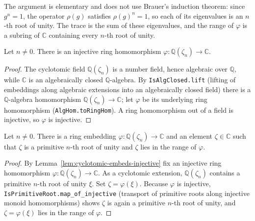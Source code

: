 The argument is elementary and does not use Brauer's induction theorem: since $g^n
= 1$, the operator $\rho(g)$ satisfies $\rho(g)^n = 1$, so each of its eigenvalues
is an $n$-th root of unity. The trace is the sum of these eigenvalues, and the
range of $\varphi$ is a subring of $\mathbb{C}$ containing every $n$-th root of
unity.

\begin{lemma}
    \label{lem:cyclotomic-embeds-injective}
    \leanok
    Let $n \neq 0$. There is an injective ring homomorphism
    $\varphi : \mathbb{Q}(\zeta_n) \to \mathbb{C}$.
\end{lemma}
\begin{proof}
    The cyclotomic field $\mathbb{Q}(\zeta_n)$ is a number field, hence algebraic
    over $\mathbb{Q}$, while $\mathbb{C}$ is an algebraically closed
    $\mathbb{Q}$-algebra. By \texttt{IsAlgClosed.lift} (lifting of embeddings
    along algebraic extensions into an algebraically closed field) there is a
    $\mathbb{Q}$-algebra homomorphism $\mathbb{Q}(\zeta_n) \to \mathbb{C}$; let
    $\varphi$ be its underlying ring homomorphism (\texttt{AlgHom.toRingHom}). A
    ring homomorphism out of a field is injective, so $\varphi$ is injective.
\end{proof}

\begin{lemma}
    \label{lem:embedding-primitive-root}
    \leanok
    Let $n \neq 0$. There is a ring embedding
    $\varphi : \mathbb{Q}(\zeta_n) \to \mathbb{C}$ and an element
    $\zeta \in \mathbb{C}$ such that $\zeta$ is a primitive $n$-th root of unity
    and $\zeta$ lies in the range of $\varphi$.
\end{lemma}
\begin{proof}
    By Lemma~\ref{lem:cyclotomic-embeds-injective} fix an injective ring
    homomorphism $\varphi : \mathbb{Q}(\zeta_n) \to \mathbb{C}$. As a cyclotomic
    extension, $\mathbb{Q}(\zeta_n)$ contains a primitive $n$-th root of unity
    $\xi$. Set $\zeta = \varphi(\xi)$. Because $\varphi$ is injective,
    \texttt{IsPrimitiveRoot.map\_of\_injective} (transport of primitive roots
    along injective monoid homomorphisms) shows $\zeta$ is again a primitive
    $n$-th root of unity, and $\zeta = \varphi(\xi)$ lies in the range of
    $\varphi$.
\end{proof}

